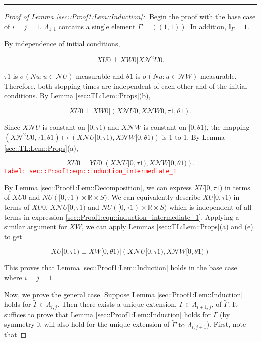 \documentclass[12pt]{article}
\newcommand{\mb}{\mathbb}
\newcommand{\mc}{\mathcal}
\newcommand{\ov}{\overline}
\newcommand{\te}{\text}
\newcommand{\tr}{\textcolor{red}}
\newcommand{\labe}[1]{\tr{\texttt{Label: #1}}}
\newcommand{\ind}{\hspace{24pt}}
\newcommand{\lin}{\rule{\linewidth}{0.4 pt}}
\newcommand{\vv}{u}								%
\renewcommand{\U}{U}							%
\newcommand{\UU}{W}								%
\renewcommand{\S}{S}							%
\newcommand{\X}{X}								%
\newcommand{\neigh}{\mc{N}}						%
\newcommand{\dneigh}{\mc{N}^2}					%
\newcommand{\cl}{\ov}							%
\newcommand{\poiss}{N}							%
\newcommand{\alt}[1]{\widetilde{#1}}			%
\newcommand{\XX}{Y}								%
\newcommand{\rt}{\tau}							%
\newcommand{\rtt}{\theta}						%
\newcommand{\apath}{\Gamma}						%
\newcommand{\pathset}[2]{\Lambda_{#1,#2}}		%
\begin{document}
\lin

\begin{proof}[Proof of Lemma \ref{sec::Proof1:Lem::Induction}:]
Begin the proof with the base case of \(i=j =1\). \(\pathset{1}{1}\) contains a single element \(\apath{} = ((1,1))\). In addition, \(\mb{I}_{\apath{}} = 1\).

By independence of initial conditions,

\[\X{\U}{0}\perp \X{\UU}{0}|\X{\dneigh{\U}}{0}.\]

\(\rt{1}\) is \(\sigma\left(\poiss{\vv}:\vv\in \neigh{\U}\right)\) measurable and \(\rtt{1}\) is \(\sigma\left(\poiss{\vv}:\vv\in \neigh{\UU}\right)\) measurable. Therefore, both stopping times are independent of each other and of the initial conditions. By Lemma \ref{sec::TL:Lem::Props}(b), 

\[\X{\U}{0}\perp \X{\UU}{0}|\left(\X{\neigh{\U}}{0},\X{\neigh{\UU}}{0},\rt{1},\rtt{1}\right).\]

Since \(\X{\neigh{\U}}{}\) is constant on \([0,\rt{1})\) and \(\X{\neigh{\UU}}{}\) is constant on \([0,\rtt{1})\), the mapping \((\X{\dneigh{\U}}{0},\rt{1},\rtt{1}) \mapsto (\X{\neigh{\U}}{[0,\rt{1})},\X{\neigh{\UU}}{[0,\rtt{1})})\) is 1-to-1. By Lemma \ref{sec::TL:Lem::Props}(a),

\begin{equation}
\X{\U}{0}\perp \XX{\U}{0}|\left(\X{\neigh{\U}}{[0,\rt{1})},\X{\neigh{\UU}}{[0,\rtt{1})}\right).
\label{sec::Proof1:eqn::induction_intermediate_1}
\end{equation}
\labe{sec::Proof1:eqn::induction\_intermediate\_1}

By Lemma \ref{sec::Proof1:Lem::Decomposition}, we can express \(\X{\U}{[0,\rt{1})}\) in terms of \(\X{\cl{\U}}{0}\) and \(\poiss{\U}([0,\rt{1})\times\mb{R}\times\S)\). We can equivalently describe \(\X{\U}{[0,\rt{1})}\) in terms of \(\X{\U}{0}\), \(\X{\neigh{\U}}{[0,\rt{1})}\) and \(\poiss{\U}([0,\rt{1})\times \mb{R}\times \S)\) which is independent of all terms in expression \eqref{sec::Proof1:eqn::induction_intermediate_1}. Applying a similar argument for \(\X{\UU}{}\), we can apply Lemmas \ref{sec::TL:Lem::Props}(a) and (e) to get

\[\X{\U}{[0,\rt{1})}\perp \X{\UU}{[0,\rtt{1})}|\left(\X{\neigh{\U}}{[0,\rt{1})},\X{\neigh{\UU}}{[0,\rtt{1})}\right)\]

This proves that Lemma \ref{sec::Proof1:Lem::Induction} holds in the base case where \(i = j = 1\).

\ind Now, we prove the general case. Suppose Lemma \ref{sec::Proof1:Lem::Induction} holds for \(\alt{\apath{}} \in \pathset{i}{j}\). Then there exists a unique extension, \(\apath{} \in \pathset{i+1}{j}\), of \(\alt{\apath{}}\). It suffices to prove that Lemma \ref{sec::Proof1:Lem::Induction} holds for \(\apath{}\) (by symmetry it will also hold for the unique extension of \(\alt{\apath{}} \te{ to } \pathset{i}{j+1}\)). First, note that


\end{proof}
\end{document}
